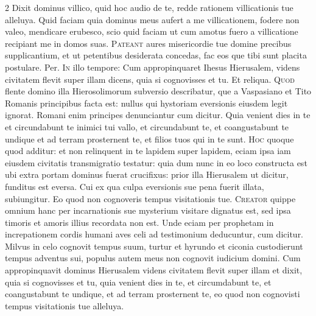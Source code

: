 \begin{multicols*}{2}
 Dixit dominus villico, quid hoc audio de te, redde rationem villicationis tue alleluya.
 Quid faciam quia dominus meus aufert a me villicationem, fodere non valeo, mendicare erubesco, scio quid faciam ut cum amotus fuero a villicatione recipiant me in domos suas.
\lettrine[lines=2]{\zallmancaps \color{Blue} P}{ateant} aures misericordie tue domine precibus supplicantium, et ut petentibus desiderata concedas, fac eos que tibi sunt placita postulare. Per.
\lettrine[lines=2]{\zallmancaps \color{Red} I}{n} illo tempore: Cum appropinquaret Ihesus Hierusalem, videns civitatem flevit super illam dicens, quia si cognovisses et tu. Et reliqua.
 \grecross
\lettrine[lines=2]{\zallmancaps \color{Blue} Q}{uod} flente domino illa Hierosolimorum subversio describatur, que a Vaspasiano et Tito Romanis principibus facta est: nullus qui hystoriam eversionis eiusdem legit ignorat. Romani enim principes denunciantur cum dicitur. Quia venient dies in te et circundabunt te inimici tui vallo, et circundabunt te, et coangustabunt te undique et ad terram prosternent te, et filios tuos qui in te sunt.
\lettrine[lines=2]{\zallmancaps \color{Red} H}{oc} quoque quod additur: et non relinquent in te lapidem super lapidem, eciam ipsa iam eiusdem civitatis transmigratio testatur: quia dum nunc in eo loco constructa est ubi extra portam dominus fuerat crucifixus: prior illa Hierusalem ut dicitur, funditus est eversa. Cui ex qua culpa eversionis sue pena fuerit illata, subiungitur. Eo quod non cognoveris tempus visitationis tue.
\lettrine[lines=2]{\zallmancaps \color{Blue} C}{reator} quippe omnium hanc per incarnationis sue mysterium visitare dignatus est, sed ipsa timoris et amoris illius recordata non est. Unde eciam per prophetam in increpationem cordis humani aves celi ad testimonium deducuntur, cum dicitur. Milvus in celo cognovit tempus suum, turtur et hyrundo et ciconia custodierunt tempus adventus sui, populus autem meus non cognovit iudicium domini.
 Cum appropinquavit dominus Hierusalem videns civitatem flevit super illam et dixit, quia si cognovisses et tu, quia venient dies in te, et circumdabunt te, et coangustabunt te undique, et ad terram prosternent te, eo quod non cognovisti tempus visitationis tue alleluya.

\end{multicols*}
